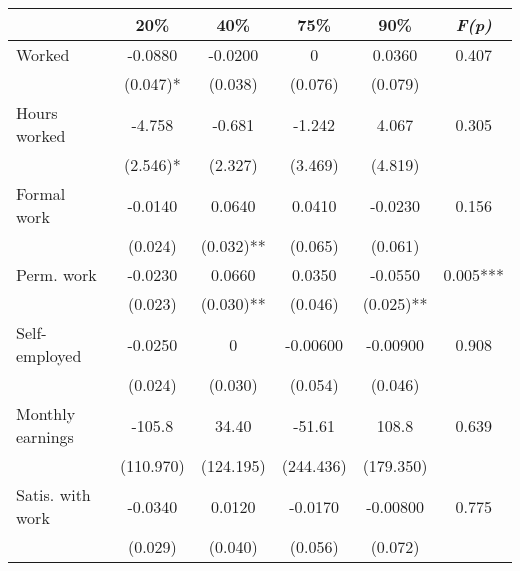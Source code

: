 \begin{tabular}{lccccc} \hline \hline
\multicolumn{1}{l}{} & \multicolumn{1}{c}{20\%} &\multicolumn{1}{c}{40\%} & \multicolumn{1}{c}{75\%} & \multicolumn{1}{c}{90\%} & \multicolumn{1}{c}{\emph{F(p)}} \\ \hline
Worked & -0.0880 & -0.0200 & 0 & 0.0360 & 0.407 \\
& (0.047)* & (0.038) & (0.076) & (0.079) &  \\
Hours worked & -4.758 & -0.681 & -1.242 & 4.067 & 0.305 \\
& (2.546)* & (2.327) & (3.469) & (4.819) &  \\
Formal work & -0.0140 & 0.0640 & 0.0410 & -0.0230 & 0.156 \\
& (0.024) & (0.032)** & (0.065) & (0.061) &  \\
Perm. work & -0.0230 & 0.0660 & 0.0350 & -0.0550 & 0.005*** \\
& (0.023) & (0.030)** & (0.046) & (0.025)** &  \\
Self-employed & -0.0250 & 0 & -0.00600 & -0.00900 & 0.908 \\
& (0.024) & (0.030) & (0.054) & (0.046) &  \\
Monthly earnings & -105.8 & 34.40 & -51.61 & 108.8 & 0.639 \\
& (110.970) & (124.195) & (244.436) & (179.350) &  \\
Satis. with work & -0.0340 & 0.0120 & -0.0170 & -0.00800 & 0.775 \\
& (0.029) & (0.040) & (0.056) & (0.072) &  \\ \hline
\end{tabular}
